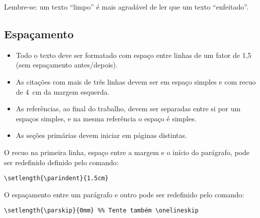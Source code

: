 \noindent Lembre-se: um texto ``limpo'' é mais agradável de ler que um texto ``enfeitado''.

\subsection{Espaçamento}\label{sec:espacamento}

\begin{itemize}%
\item Todo o texto deve ser formatado com espaço entre linhas de um fator de 1,5 (sem espaçamento antes/depois).
\item As citações com mais de três linhas devem ser em espaço simples e com recuo de \SI{4}{cm} da margem esquerda.
\item As referências, ao final do trabalho, devem ser separadas entre si por um espaços simples, e na mesma referência o espaço é simples.
\item As seções primárias devem iniciar em páginas distintas.
\end{itemize}

O recuo na primeira linha, espaço entre a margem e o início do parágrafo, pode ser redefinido definido pelo comando:

\begin{SingleSpacing}%
\begin{verbatim}
\setlength{\parindent}{1.5cm}
\end{verbatim}
\end{SingleSpacing}

O espaçamento entre um parágrafo e outro pode ser redefinido pelo comando:

\begin{SingleSpacing}%
\begin{verbatim}
\setlength{\parskip}{0mm} %% Tente também \onelineskip
\end{verbatim}
\end{SingleSpacing}

